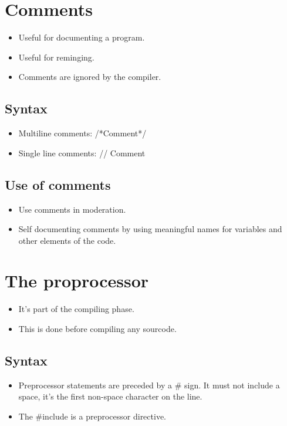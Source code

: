 \section{Comments}
\begin{itemize}
    \item Useful for documenting a program. 
    \item Useful for reminging. 
    \item Comments are ignored by the compiler. 
\end{itemize}

\subsection{Syntax}
\begin{itemize}
    \item Multiline comments: /*Comment*/
    \item Single line comments: // Comment 
\end{itemize}

\subsection{Use of comments}
\begin{itemize}
    \item Use comments in moderation. 
    \item Self documenting comments by using meaningful names for variables and  other elements of the code. 
\end{itemize}


\section{The proprocessor}
\begin{itemize}
    \item It's part of the compiling phase. 
    \item This is done before compiling any sourcode. 
\end{itemize}

\subsection{Syntax}
\begin{itemize}
    \item Preprocessor statements are preceded by a \# sign. It must not include a space, it's the first non-space character on the line. 
    \item The \#include is a preprocessor directive. 
\end{itemize}

